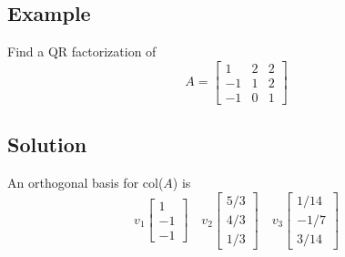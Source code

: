 \subsection*{Example}
Find a QR factorization of
\[A=\begin{bmatrix}
        1 & 2 & 2 \\-1&1&2\\-1&0&1
    \end{bmatrix}\]

\subsection*{Solution}
An orthogonal basis for col($A$) is
\[
    v_1\begin{bmatrix}
        1 \\-1\\-1
    \end{bmatrix} \quad v_2\begin{bmatrix}
        5/3 \\4/3\\1/3
    \end{bmatrix} \quad v_3\begin{bmatrix}
        1/14 \\-1/7\\3/14
    \end{bmatrix}
\]

